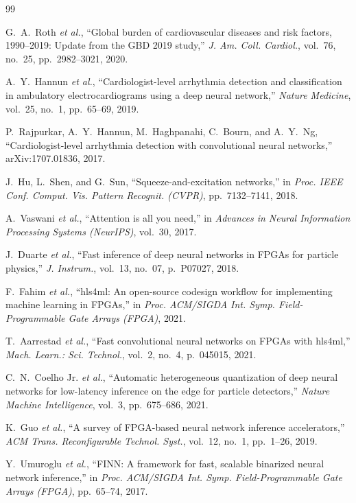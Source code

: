 \documentclass[12pt, letterpaper]{article}
\begin{document}
\begin{thebibliography}{99}

G.~A.~Roth \textit{et al.},
``Global burden of cardiovascular diseases and risk factors, 1990--2019: Update from the GBD 2019 study,''
\textit{J. Am. Coll. Cardiol.}, vol.~76, no.~25, pp.~2982--3021, 2020.

A.~Y.~Hannun \textit{et al.},
``Cardiologist-level arrhythmia detection and classification in ambulatory electrocardiograms using a deep neural network,''
\textit{Nature Medicine}, vol.~25, no.~1, pp.~65--69, 2019.

P.~Rajpurkar, A.~Y.~Hannun, M.~Haghpanahi, C.~Bourn, and A.~Y.~Ng,
``Cardiologist-level arrhythmia detection with convolutional neural networks,''
arXiv:1707.01836, 2017.

J.~Hu, L.~Shen, and G.~Sun,
``Squeeze-and-excitation networks,''
in \textit{Proc. IEEE Conf. Comput. Vis. Pattern Recognit. (CVPR)},
pp.~7132--7141, 2018.

A.~Vaswani \textit{et al.},
``Attention is all you need,''
in \textit{Advances in Neural Information Processing Systems (NeurIPS)},
vol.~30, 2017.

J.~Duarte \textit{et al.},
``Fast inference of deep neural networks in FPGAs for particle physics,''
\textit{J. Instrum.}, vol.~13, no.~07, p.~P07027, 2018.

F.~Fahim \textit{et al.},
``hls4ml: An open-source codesign workflow for implementing machine learning in FPGAs,''
in \textit{Proc. ACM/SIGDA Int. Symp. Field-Programmable Gate Arrays (FPGA)},
2021.

T.~Aarrestad \textit{et al.},
``Fast convolutional neural networks on FPGAs with hls4ml,''
\textit{Mach. Learn.: Sci. Technol.}, vol.~2, no.~4, p.~045015, 2021.

C.~N.~Coelho Jr. \textit{et al.},
``Automatic heterogeneous quantization of deep neural networks for low-latency inference on the edge for particle detectors,''
\textit{Nature Machine Intelligence}, vol.~3, pp.~675--686, 2021.

K.~Guo \textit{et al.},
``A survey of FPGA-based neural network inference accelerators,''
\textit{ACM Trans. Reconfigurable Technol. Syst.}, vol.~12, no.~1,
pp.~1--26, 2019.

Y.~Umuroglu \textit{et al.},
``FINN: A framework for fast, scalable binarized neural network inference,''
in \textit{Proc. ACM/SIGDA Int. Symp. Field-Programmable Gate Arrays (FPGA)},
pp.~65--74, 2017.


\end{thebibliography}
\end{document}
